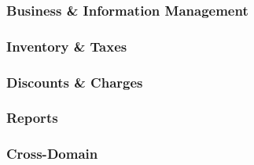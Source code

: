 \documentclass[]{VUMIFTemplateClass}
\begin{document}
\subsubsection{Business \& Information Management}
\subsubsection{Inventory \& Taxes}
\subsubsection{Discounts \& Charges}
\subsubsection{Reports}

\subsubsection{Cross-Domain}


\printbibliography[title = {References and sources}]
\end{document}
